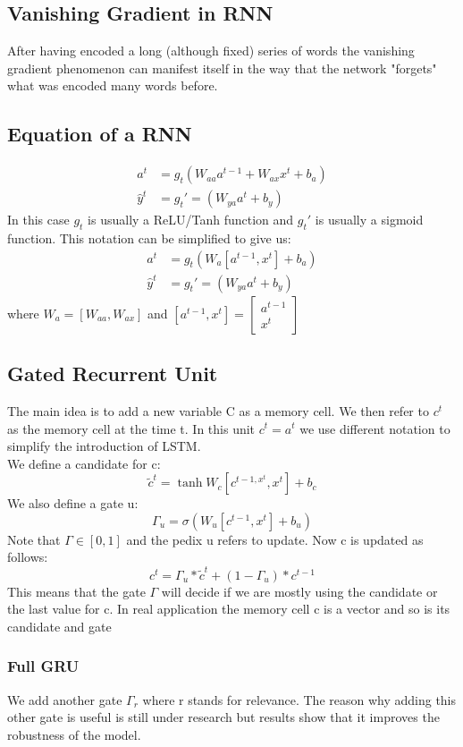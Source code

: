 \documentclass{article}
\begin{document}
\subsection*{Vanishing Gradient in RNN}
After having encoded a long (although fixed) series of words the vanishing gradient phenomenon can manifest itself in the way that the network "forgets" what was encoded many words before.
\subsection*{Equation of a RNN}
\begin{align*}
    a^{t} &= g_t(W_{aa}a^{t-1}+W_{ax}x^{t}+b_a)\\
    \hat{y}^t &= g_t'=(W_{ya}a^t+b_y)
\end{align*}
In this case $g_t$ is usually a ReLU/Tanh function and $g_t'$ is usually a sigmoid function. This notation can be simplified to give us:
\begin{align*}
    a^{t} &= g_t(W_{a}[a^{t-1},x^{t}]+b_a)\\
    \hat{y}^t &= g_t'=(W_{ya}a^t+b_y)
\end{align*}
where $W_a = [W_{aa}, W_{ax}]$ and $[a^{t-1},x^{t}] = \begin{bmatrix}
    a^{t-1} \\
    x^{t}
\end{bmatrix}$
\subsection*{Gated Recurrent Unit}
The main idea is to add a new variable C as a memory cell. We then refer to $c^t$ as the memory cell at the time t. In this unit $c^t = a^t$ we use different notation to simplify the introduction of LSTM.\\
We define a candidate for c:
\[ 
    \tilde{c}^t = \tanh{W_c[c^{t-1, x^t}, x^t]+b_c}
\]
We also define a gate u:
\[ 
    \Gamma_u = \sigma(W_u[c^{t-1}, x^t]+b_u)
\]Note that $\Gamma \in [0,1]$ and the pedix u refers to update. Now c is updated as follows:
\[ 
    c^t = \Gamma_u * \tilde{c}^t + (1-\Gamma_u)* c^{t-1} 
\]This means that the gate $\Gamma$ will decide if we are mostly using the candidate or the last value for c. In real application the memory cell c is a vector and so is its candidate and gate
\subsubsection*{Full GRU}
We add another gate $\Gamma_r$ where r stands for relevance. The reason why adding this other gate is useful is still under research but results show that it improves the robustness of the model.
\end{document}
